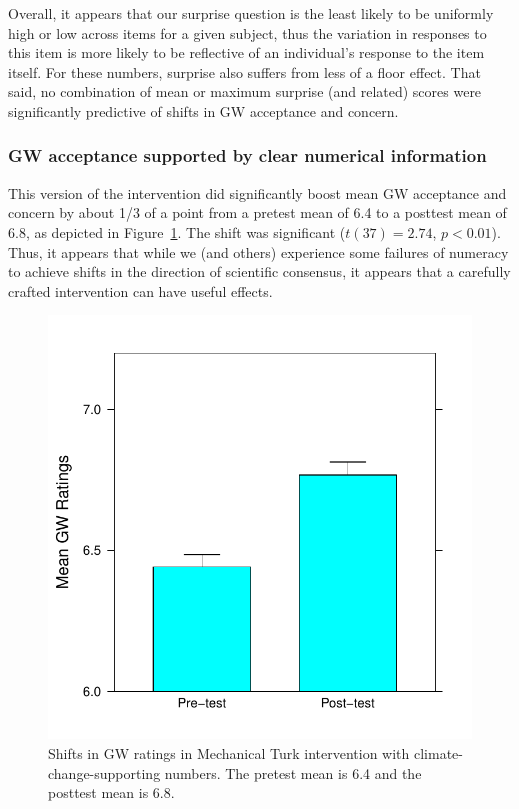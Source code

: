 Overall, it appears that our surprise question is the least likely to be
uniformly high or low across items for a given subject, thus the variation in
responses to this item is more likely to be reflective of an individual's
response to the item itself. For these numbers, surprise also suffers from less of a
floor effect. That said, no combination of mean or maximum surprise (and
related) scores were significantly predictive of shifts in GW acceptance and
concern.

\subsubsection{GW acceptance supported by clear numerical information}

This version of the intervention did significantly boost mean GW acceptance and
concern by about 1/3 of a point from a pretest mean of 6.4 to a posttest mean of
6.8, as depicted in Figure~\ref{fig:prondi-gw}. The shift was significant
($t(37) = 2.74$, $p < 0.01$). Thus, it appears that while we (and others)
experience some failures of numeracy to achieve shifts in the direction of
scientific consensus, it appears that a carefully crafted intervention can have
useful effects.

\begin{figure}
    \centering
    \includegraphics{CCO-prondi-gw.pdf}
    \caption{Shifts in GW ratings in Mechanical Turk intervention with
        climate-change-supporting numbers. The pretest mean is 6.4 and the
        posttest mean is 6.8.}
    \label{fig:prondi-gw}
\end{figure}


